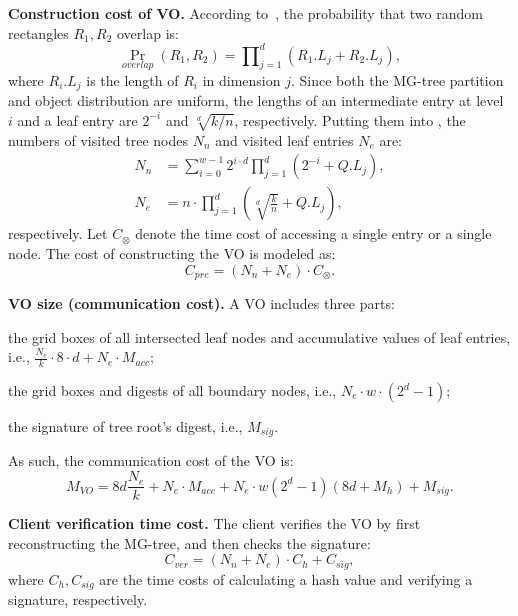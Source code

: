 \textbf{Construction cost of VO.} According to~\cite{10.1145/153850.153878}, the probability that two random rectangles $R_1, R_2$ overlap is:
\begin{equation}
  {\Pr}_{overlap}(R_1, R_2)= \prod\nolimits_{j=1}^d(R_1.L_j + R_2.L_j),
  \label{eqn:aggregate-queries:inter_pro}
\end{equation}
where $R_i.L_j$ is the length of $R_i$ in dimension $j$. Since both the MG-tree partition and object distribution are uniform, the lengths of an intermediate entry at level $i$ and a leaf entry are $2^{-i}$ and $\sqrt[d]{k/n}$, respectively. Putting them into , the numbers of visited tree nodes $N_n$ and visited leaf entries $N_e$ are:
\begin{align*}
  N_n &= \sum_{i=0}^{w-1} 2^{i\cdot d}\prod_{j=1}^d(2^{-i}+Q.L_j), \\
  N_e &= n\cdot\prod_{j=1}^d(\sqrt[d]{\frac{k}{n}}+Q.L_j),
\end{align*}
respectively. Let $C_{\otimes}$ denote the time cost of accessing a single entry or a single node. The cost of constructing the VO is modeled as:
\begin{equation*}
  C_{pre} = (N_n + N_e) \cdot C_{\otimes}.
\end{equation*}

\textbf{VO size (communication cost).} A VO includes three parts:
\begin{inlineenum}
\item the grid boxes of all intersected leaf nodes and accumulative values of leaf entries, i.e., $\frac{N_e}{k} \cdot 8 \cdot d + N_e \cdot M_{acc}$;
\item the grid boxes and digests of all boundary nodes, i.e., $N_e \cdot w \cdot (2^d - 1)$;
\item the signature of tree root's digest, i.e., $M_{sig}$.
\end{inlineenum}
As such, the communication cost of the VO is:
\begin{equation*}
  M_{VO} = 8d \frac{N_e}{k}  + N_e \cdot M_{acc} + N_e \cdot w (2^d-1) (8d + M_h) +  M_{sig}.
\end{equation*}

\textbf{Client verification time cost.} The client verifies the VO by first reconstructing the MG-tree, and then checks the signature:
\begin{equation*}
  C_{ver} = (N_n + N_e) \cdot C_{h} + C_{sig},
\end{equation*}
where $C_{h}, C_{sig}$ are the time costs of calculating a hash value and verifying a signature, respectively.

